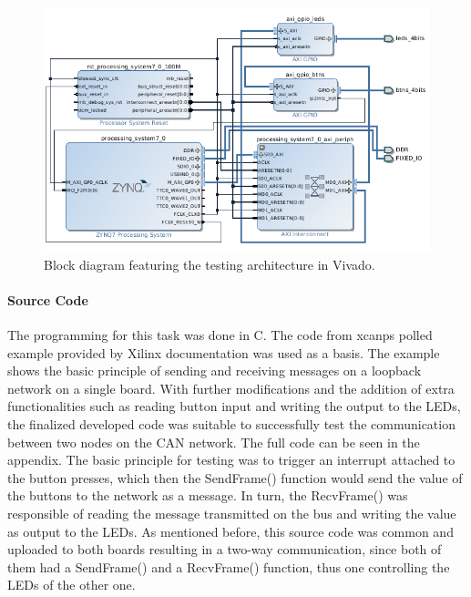 \begin{figure}[h!]
	\centering
	\includegraphics[width = 1.1\linewidth]{graphics/Zybo_BasicTestingArchitecture_for_CAN.png}
	\caption{Block diagram featuring the testing architecture in Vivado.}
	\label{fig:CAN_Testing_Architecture}
\end{figure}

\paragraph{Source Code}
The programming for this task was done in C.
The code from xcanps polled example provided by Xilinx documentation was used as a basis.
The example shows the basic principle of sending and receiving messages on a loopback network on a single board.
With further modifications and the addition of extra functionalities such as reading button input and writing the output to the LEDs, the finalized developed code was suitable to successfully test the communication between two nodes on the CAN network. The full code can be seen in the appendix.
The basic principle for testing was to trigger an interrupt attached to the button presses, which then the SendFrame() function would send the value of the buttons to the network as a message.
In turn, the RecvFrame() was responsible of reading the message transmitted on the bus and writing the value as output to the LEDs.
As mentioned before, this source code was common and uploaded to both boards resulting in a two-way communication, since both of them had a SendFrame() and a RecvFrame() function, thus one controlling the LEDs of the other one.

